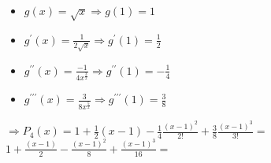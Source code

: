 \documentclass[../practica_05.tex]{subfiles}
\begin{document}
\begin{enumerate}
            \begin{itemize}
                \item $g(x) = \sqrt{x}                                          \Rightarrow g                     (1) = 1 $
                \item $g^\prime(x) = \frac{1}{2\sqrt{x}}                        \Rightarrow g^\prime              (1) = \frac{1}{2} $
                \item $g^{\prime\prime}(x) = \frac{-1}{4x^{\frac{3}{2}}}        \Rightarrow g^{\prime\prime}      (1) = -\frac{1}{4}$
                \item $g^{\prime\prime\prime}(x) = \frac{3}{8x^{\frac{5}{2}}}   \Rightarrow g^{\prime\prime\prime}(1) = \frac{3}{8}$
            \end{itemize}

            $\Rightarrow P_4(x) = 1 + \frac{1}{2}(x-1) - \frac{1}{4}\frac{(x-1)^2}{2!} + \frac{3}{8}\frac{(x-1)^3}{3!} = $
            $1 + \frac{(x-1)}{2} - \frac{(x-1)^2}{8} + \frac{(x-1)^3}{16} = $

    \end{enumerate}
\end{document}
